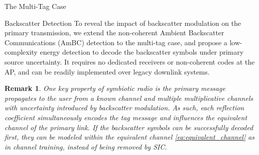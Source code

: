 \documentclass[journal]{IEEEtran}
\newtheorem{remark}{Remark}
\begin{document}
\begin{section}{The Multi-Tag Case}
		\begin{subsection}{Backscatter Detection}
			To reveal the impact of backscatter modulation on the primary transmission, we extend the non-coherent Ambient Backscatter Communications (AmBC) detection \cite{Qian2019} to the multi-tag case, and propose a low-complexity energy detection to decode the backscatter symbols under primary source uncertainty. It requires no dedicated receivers or non-coherent codes at the AP, and can be readily implemented over legacy downlink systems.

			\begin{remark}
				One key property of symbiotic radio is the primary message propagates to the user from a known channel and multiple multiplicative channels with uncertainty introduced by backscatter modulation. As such, each reflection coefficient simultaneously encodes the tag message and influences the equivalent channel of the primary link. If the backscatter symbols can be successfully decoded first, they can be modeled within the equivalent channel \eqref{eq:equivalent_channel} as in channel training, instead of being removed by SIC.
			\end{remark}


\end{subsection}
\end{section}
\end{document}

